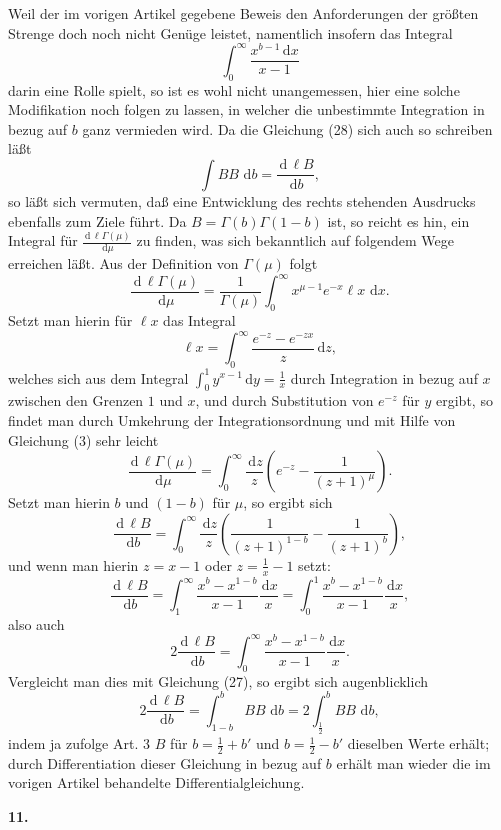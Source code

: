 \documentclass[11pt]{article}
\newcommand{\dd}{\,\mathrm d}
\newcommand{\art}[1]{\bigskip\begin{center}\large\bfseries #1.\end{center}\nopagebreak}
\begin{document}
Weil der im vorigen Artikel gegebene Beweis den Anforderungen der größten Strenge doch noch nicht Genüge leistet, namentlich insofern das Integral
\[
\int_0^\infty\frac{x^{b-1}\dd x}{x-1}
\]
darin eine Rolle spielt, so ist es wohl nicht unangemessen, hier eine solche Modifikation noch folgen zu lassen, in welcher die unbestimmte Integration in bezug auf $b$ ganz vermieden wird. Da die Gleichung (28) sich auch so schreiben läßt
\[
\int B B\,\dd b=\frac{\dd\,\ell B}{\dd b},
\]
so läßt sich vermuten, daß eine Entwicklung des rechts stehenden Ausdrucks ebenfalls zum Ziele führt. Da $B=\Gamma(b)\Gamma(1-b)$ ist, so reicht es hin, ein Integral für $\frac{\dd\,\ell\Gamma(\mu)}{\dd\mu}$ zu finden, was sich bekanntlich auf folgendem Wege erreichen läßt. Aus der Definition von $\Gamma(\mu)$ folgt
\[
\frac{\dd\,\ell\Gamma(\mu)}{\dd\mu}
=\frac1{\Gamma(\mu)}
  \int_0^\infty x^{\mu-1}e^{-x}\ell x\,\dd x.
\]
Setzt man hierin für $\ell x$ das Integral
\[
\ell x=\int_0^\infty\frac{e^{-z}-e^{-zx}}{z}\dd z,
\]
welches sich aus dem Integral $\int_0^1y^{x-1}\dd y=\frac1x$ durch Integration in bezug auf $x$ zwischen den Grenzen $1$ und $x$, und durch Substitution von $e^{-z}$ für $y$ ergibt, so findet man durch Umkehrung der Integrationsordnung und mit Hilfe von Gleichung (3) sehr leicht
\[
\frac{\dd\,\ell\Gamma(\mu)}{\dd\mu}
=\int_0^\infty\frac{\dd z}{z}
\left(e^{-z}-\frac1{(z+1)^\mu}\right).
\]
Setzt man hierin $b$ und $(1-b)$ für $\mu$, so ergibt sich
\[
\frac{\dd\,\ell B}{\dd b}
=\int_0^\infty\frac{\dd z}{z}
\left(\frac1{(z+1)^{1-b}}-\frac1{(z+1)^b}\right),
\]
und wenn man hierin $z=x-1$ oder $z=\frac1x-1$ setzt:
\[
\frac{\dd\,\ell B}{\dd b}
=\int_1^\infty\frac{x^b-x^{1-b}}{x-1}\frac{\dd x}{x}
=\int_0^1\frac{x^b-x^{1-b}}{x-1}\frac{\dd x}{x},
\]
also auch
\[
2\frac{\dd\,\ell B}{\dd b}
=\int_0^\infty\frac{x^b-x^{1-b}}{x-1}\frac{\dd x}{x}.
\]
Vergleicht man dies mit Gleichung (27), so ergibt sich augenblicklich
\begin{equation}
2\frac{\dd\,\ell B}{\dd b}
=\int_{1-b}^{b} B B\,\dd b
=2\int_{\frac12}^{b} B B\,\dd b,
\tag{29}
\end{equation}
indem ja zufolge Art. 3 $B$ für $b=\frac12+b'$ und $b=\frac12-b'$ dieselben Werte erhält; durch Differentiation dieser Gleichung in bezug auf $b$ erhält man wieder die im vorigen Artikel behandelte Differentialgleichung.

\art{11}
\end{document}
